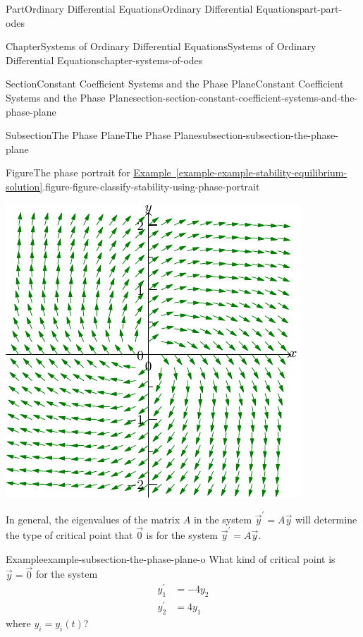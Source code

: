 \documentclass[twoside,10pt,]{book}
\newcommand{\xreffont}{\relax}
\numberwithin{equation}{part}
\begin{document}
\begin{partptx}{Part}{Ordinary Differential Equations}{}{Ordinary Differential Equations}{}{}{part-part-odes}
\begin{chapterptx}{Chapter}{Systems of Ordinary Differential Equations}{}{Systems of Ordinary Differential Equations}{}{}{chapter-systems-of-odes}
\begin{sectionptx}{Section}{Constant Coefficient Systems and the Phase Plane}{}{Constant Coefficient Systems and the Phase Plane}{}{}{section-section-constant-coefficient-systems-and-the-phase-plane}
\begin{subsectionptx}{Subsection}{The Phase Plane}{}{The Phase Plane}{}{}{subsection-subsection-the-phase-plane}
\begin{figureptx}{Figure}{The phase portrait for \hyperref[example-example-stability-equilibrium-solution]{Example~{\xreffont\ref{example-example-stability-equilibrium-solution}}}.}{figure-figure-classify-stability-using-phase-portrait}{}
\begin{image}{0.25}{0.5}{0.25}{}
\includegraphics[width=\linewidth]{generated/asymptote/image-16.pdf}
\end{image}%
\tcblower
\end{figureptx}%
In general, the eigenvalues of the matrix \(A\) in the system \(\vec{y}^\prime = A\vec{y}\) will determine the type of critical point that \(\vec{0}\) is for the system \(\vec{y}^\prime=A\vec{y}\).%
\begin{example}{Example}{}{example-subsection-the-phase-plane-o}%
What kind of critical point is \(\vec{y} = \vec{0}\) for the system%
\begin{align*}
y^\prime_{1} & = -4y_{2}\\
y^\prime_{2}  & =  4y_{1}
\end{align*}
where \(y_{i} = y_{i}(t)\)?%
\par\smallskip%

\end{example}
\end{subsectionptx}
\end{sectionptx}
\end{chapterptx}
\end{partptx}
\end{document}
